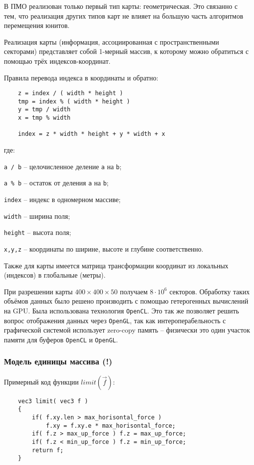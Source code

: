 В ПМО реализован только первый тип карты: геометрическая. Это связанно с тем, что
реализация других типов карт не влияет на большую часть алгоритмов перемещения юнитов.

Реализация карты (информация, ассоциированная с пространственными секторами)
представляет собой 1-мерный массив, к которому можно обратиться с помощью трёх
индексов-координат.

Правила перевода индекса в координаты и обратно:

\begin{verbatim}
    z = index / ( width * height )
    tmp = index % ( width * height )
    y = tmp / width
    x = tmp % width

    index = z * width * height + y * width + x
\end{verbatim}
\vspace{-0.5em}

где:

\verb|a / b| -- целочисленное деление \verb|a| на \verb|b|;

\verb|a % b| -- остаток от деления \verb|a| на \verb|b|;

\verb|index| -- индекс в одномерном массиве;

\verb|width| -- ширина поля;

\verb|height| -- высота поля;

\verb|x,y,z| -- координаты по ширине, высоте и глубине соответственно.

Также для карты имеется матрица трансформации координат из локальных (индексов)
в глобальные (метры).

При разрешении карты $400 \times 400 \times 50$ получаем $8 \cdot 10^6$ секторов.
Обработку таких объёмов данных было решено производить с помощью гетерогенных 
вычислений на GPU. Была использована технология \verb|OpenCL|. Это так же 
позволяет решить вопрос отображения данных через \verb|OpenGL|, так как
интероперабельность с графической системой использует zero-copy память -- 
физически это один участок памяти для буферов \verb|OpenCL| и \verb|OpenGL|.

\newpage
\subsubsection{Модель единицы массива (!)}

Примерный код функции $limit \left( \vec f \right)$:

\begin{verbatim}
    vec3 limit( vec3 f )
    {
        if( f.xy.len > max_horisontal_force )
            f.xy = f.xy.e * max_horisontal_force;
        if( f.z > max_up_force ) f.z = max_up_force;
        if( f.z < min_up_force ) f.z = min_up_force;
        return f;
    }
\end{verbatim}


